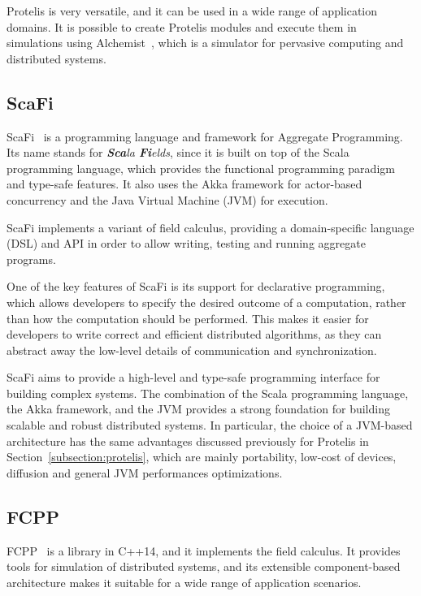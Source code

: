 Protelis is very versatile, and it can be used in a wide range of application domains. It is possible to create Protelis modules and execute them in simulations using Alchemist~\cite{alchemist}, which is a simulator for pervasive computing and distributed systems.

\subsection{ScaFi}\label{subsection:scafi}
ScaFi~\cite{scafi_introduction} is a programming language and framework for Aggregate Programming. Its name stands for \textit{\textbf{Sca}la \textbf{Fi}elds}, since it is built on top of the Scala programming language, which provides the functional programming paradigm and type-safe features. It also uses the Akka framework for actor-based concurrency and the Java Virtual Machine (JVM) for execution.

ScaFi implements a variant of field calculus, providing a domain-specific language (DSL) and API in order to allow writing, testing and running aggregate programs.

One of the key features of ScaFi is its support for declarative programming, which allows developers to specify the desired outcome of a computation, rather than how the computation should be performed. This makes it easier for developers to write correct and efficient distributed algorithms, as they can abstract away the low-level details of communication and synchronization.

ScaFi aims to provide a high-level and type-safe programming interface for building complex systems.\newline
The combination of the Scala programming language, the Akka framework, and the JVM provides a strong foundation for building scalable and robust distributed systems.\newline
In particular, the choice of a JVM-based architecture has the same advantages discussed previously for Protelis in Section~\ref{subsection:protelis}, which are mainly portability, low-cost of devices, diffusion and general JVM performances optimizations.

\subsection{FCPP}\label{subsection:fcpp}
FCPP~\cite{fcpp_introduction} is a library in C++14, and it implements the field calculus.\newline
It provides tools for simulation of distributed systems, and its extensible component-based architecture makes it suitable for a wide range of application scenarios.


